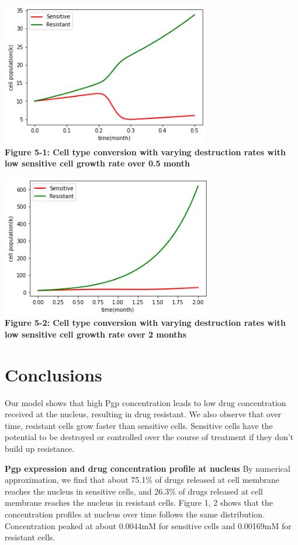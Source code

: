 \documentclass{edm_article}
\begin{document}
\includegraphics[scale = 0.6]{bell.png}\\
\textbf{Figure 5-1: Cell type conversion with varying destruction rates with low sensitive cell growth rate over 0.5 month}

\includegraphics[scale = 0.6]{low growth rate.png}\\
\textbf{Figure 5-2: Cell type conversion with varying destruction rates with low sensitive cell growth rate over 2 months}

\section{Conclusions}
Our model shows that high Pgp concentration leads to low drug concentration received at the nucleus, resulting in drug resistant. We also observe that over time, resistant cells grow faster than sensitive cells. Sensitive cells have the potential to be destroyed or controlled over the course of treatment if they don't build up resistance.

\textbf{Pgp expression and drug concentration profile at nucleus} By numerical approximation, we find that about 75.1\% of drugs released at cell membrane reaches the nucleus in sensitive cells, and 26.3\% of drugs released at cell membrane reaches the nucleus in resistant cells. Figure 1, 2 shows that the concentration profiles at nucleus over time follows the same distribution. Concentration peaked at about 0.0044mM for sensitive cells and 0.00169mM for resistant cells. 
\end{document}
